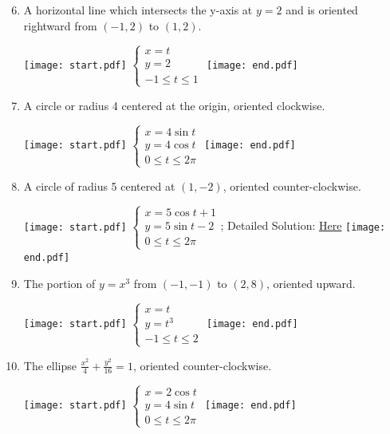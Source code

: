 \documentclass[12pt]{article}
\begin{document}
\begin{enumerate}
\end{enumerate}


\begin{enumerate}
\setcounter{enumi}{5}

\item A horizontal line which intersects the y-axis at $y=2$ and is oriented rightward from $(-1,2)$ to $(1,2)$. 

\texttt{[image: start.pdf]}
{{$\left\{\begin{array}{l}
x=t\\
y=2\\
-1\leq t\leq 1\end{array}\right.$}}
\texttt{[image: end.pdf]}


\item A circle or radius 4 centered at the origin, oriented clockwise.  

\texttt{[image: start.pdf]}
{{$\left\{\begin{array}{l}
x=4\sin{t}\\
y=4\cos{t}\\
0\leq t\leq 2\pi\end{array}\right.$}}
\texttt{[image: end.pdf]}


\item A circle of radius 5 centered at $(1,-2)$, oriented counter-clockwise. 

\texttt{[image: start.pdf]}
{{$\left\{\begin{array}{l}
x=5\cos{t}+1\\
y=5\sin{t}-2\\
0\leq t\leq 2\pi \end{array}\right.$; Detailed Solution: \textcolor{blue}{\href{http://www.math.drexel.edu/classes/Calculus/resources/Math122HW/Solutions/122_17_Parametric_08.pdf}{Here}} }}
\texttt{[image: end.pdf]}


\item The portion of $y=x^3$ from $(-1,-1)$ to $(2,8)$, oriented upward. 

\texttt{[image: start.pdf]}
{{$\left\{\begin{array}{l}
x=t\\
y=t^3\\
-1\leq t\leq 2\end{array}\right.$}}
\texttt{[image: end.pdf]}


\newpage

\item The ellipse $\frac{x^2}{4}+\frac{y^2}{16}=1$, oriented counter-clockwise. 

\texttt{[image: start.pdf]}
{{$\left\{\begin{array}{l}
x=2\cos{t}\\
y=4\sin{t}\\
0\leq t\leq 2\pi\end{array}\right.$}}
\texttt{[image: end.pdf]}


\end{enumerate}
\end{document}
